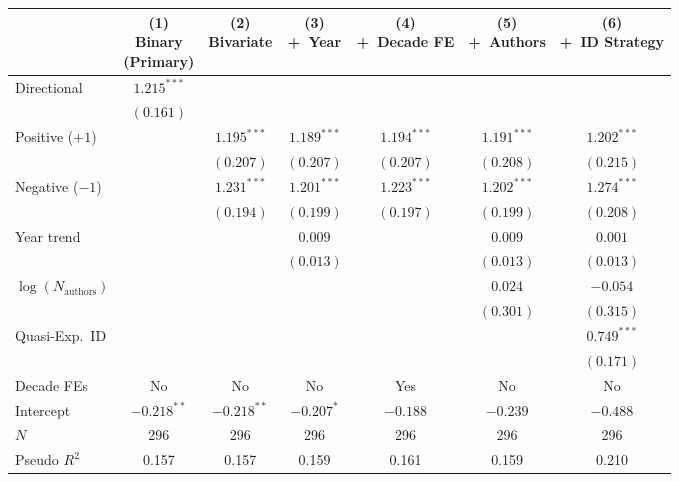 \begin{tabular}{lcccccc}
\toprule
 & \shortstack{(1)\\Binary\\(Primary)} & \shortstack{(2)\\Bivariate} & \shortstack{(3)\\+~Year} & \shortstack{(4)\\+~Decade FE} & \shortstack{(5)\\+~Authors} & \shortstack{(6)\\+~ID Strategy} \\
\midrule
Directional     & $1.215^{***}$ &               &               &               &               &               \\
                & $(0.161)$     &               &               &               &               &               \\[4pt]
Positive ($+1$) &               & $1.195^{***}$ & $1.189^{***}$ & $1.194^{***}$ & $1.191^{***}$ & $1.202^{***}$ \\
                &               & $(0.207)$     & $(0.207)$     & $(0.207)$     & $(0.208)$     & $(0.215)$     \\[4pt]
Negative ($-1$) &               & $1.231^{***}$ & $1.201^{***}$ & $1.223^{***}$ & $1.202^{***}$ & $1.274^{***}$ \\
                &               & $(0.194)$     & $(0.199)$     & $(0.197)$     & $(0.199)$     & $(0.208)$     \\[4pt]
Year trend      &               &               & $0.009$       &               & $0.009$       & $0.001$       \\
                &               &               & $(0.013)$     &               & $(0.013)$     & $(0.013)$     \\[4pt]
$\log(N_{\text{authors}})$ & & &             &               & $0.024$       & $-0.054$      \\
                &               &               &               &               & $(0.301)$     & $(0.315)$     \\[4pt]
Quasi-Exp.\ ID  &               &               &               &               &               & $0.749^{***}$ \\
                &               &               &               &               &               & $(0.171)$     \\[4pt]
Decade FEs      & No            & No            & No            & Yes           & No            & No            \\
Intercept       & $-0.218^{**}$ & $-0.218^{**}$ & $-0.207^{*}$  & $-0.188$      & $-0.239$      & $-0.488$      \\
\midrule
$N$             & 296           & 296           & 296           & 296           & 296           & 296           \\
Pseudo $R^2$    & 0.157         & 0.157         & 0.159         & 0.161         & 0.159         & 0.210         \\
\bottomrule
\end{tabular}
